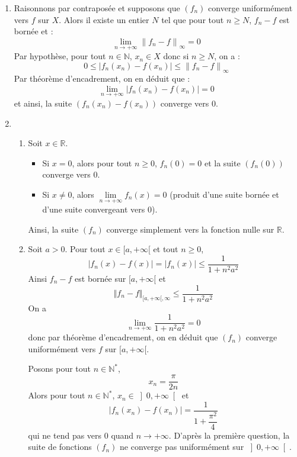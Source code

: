 \documentclass[a4paper,10pt]{report}
\begin{document}
\corr \begin{enumerate}

\item Raisonnons par contraposée et supposons que $(f_n)$ converge uniformément vers $f$ sur $X$. Alors il existe un entier $N$ tel que pour tout $n\geq N$, $f_n-f$ est bornée et :
$$\lim\limits_{n\to+\infty}^{}\left\| {f_n  - f} \right\|_\infty   = 0$$
Par hypothèse, pour tout $n\in\mathbb{N}$, $x_n\in X$ donc si $n \geq N$, on a :
$$0 \leq \left| {f_n (x_n ) - f(x_n )} \right| \leqslant \left\| {f_n  - f} \right\|_\infty  $$
Par théorème d'encadrement, on en déduit que :
$$\lim\limits_{n\to+\infty}^{}\left| {f_n (x_n ) - f(x_n )} \right|=0$$
et ainsi, la suite $( {f_n (x_n ) - f(x_n )})$ converge vers $0$.

\item
\begin{enumerate}
\item Soit $x\in\mathbb{R}$.
\begin{itemize}
\item Si $x=0$, alors pour tout $n \geq 0$, $f_n(0)=0$ et la suite $(f_n(0))$ converge vers $0$.
\item Si $x \neq 0$, alors $\lim\limits_{n\to+\infty}^{}f_n (x)=0$ (produit d'une suite bornée et d'une suite convergeant vers $0$).
\end{itemize}
Ainsi, la suite $(f_n )$ converge simplement vers la fonction nulle sur $\mathbb{R}$.
\item Soit $a>0$. Pour tout $x \in [a, + \infty[$ et tout $n \geq 0$,
$$\left| {f_n (x)} -f(x)\right|=|f_n(x)| \leqslant \dfrac{1}{{1 + n^2a^2  }}$$
Ainsi $f_n-f$ est bornée sur $[a, + \infty[$ et 
$$ \Vert f_n -f \Vert_{[a, + \infty[, \infty} \leq \dfrac{1}{{1 + n^2a^2  }}$$
On a 
$$\lim\limits_{n\to+\infty}^{}\dfrac{1}{{1 + n^2a^2  }}=0$$
donc par théorème d'encadrement, on en déduit que $(f_n)$ converge uniformément vers $f$ sur $[a, + \infty[$.

\medskip

\noindent Posons pour tout $n\in\mathbb{N}^*$, 
$$x_n  = \dfrac{\pi}{2n}$$
Alors pour tout $n \in \mathbb{N}^*$, $x_n\in \left]  0,+\infty\right[$ et  
$$|f_n (x_n )-f(x_n)| = \dfrac{1}{{1 + \dfrac{{\pi ^2 }}{4}}}$$
qui ne tend pas vers 0 quand $n\rightarrow +\infty$. D'après la première question, la suite de fonctions $(f_n )$ ne converge pas uniformément sur $\left] {0, + \infty } \right[$.
\end{enumerate}
\end{enumerate}
\end{document}
